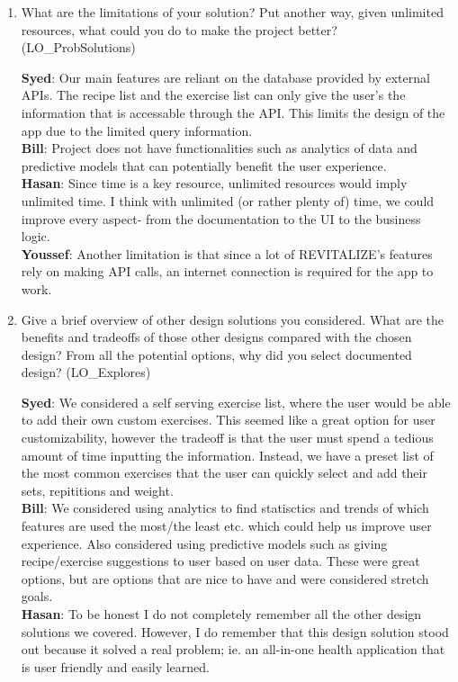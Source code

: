 \documentclass[12pt, titlepage]{article}
\begin{document}
	\begin{enumerate}
		\item What are the limitations of your solution?  Put another way, given
		unlimited resources, what could you do to make the project better? (LO\_ProbSolutions)
		
		\textbf{Syed}: Our main features are reliant on the database provided by external APIs. The recipe list and the exercise list can only give the user's the information that is accessable through the API. This limits the design of the app due to the limited query information. \\
		\textbf{Bill}: Project does not have functionalities such as analytics of data and predictive models that can potentially benefit the user experience. \\
		\textbf{Hasan}: Since time is a key resource, unlimited resources would imply unlimited time. I think with unlimited (or rather plenty of) time, we could improve every aspect- from the documentation to the UI to the business logic. \\
		\textbf{Youssef}: Another limitation is that since a lot of REVITALIZE's features rely on making API calls, an internet connection is required for the app to work. \\
		
		
		\item Give a brief overview of other design solutions you considered.  What
		are the benefits and tradeoffs of those other designs compared with the chosen
		design?  From all the potential options, why did you select documented design?
		(LO\_Explores)
		
		\textbf{Syed}: We considered a self serving exercise list, where the user would be able to add their own custom exercises. This seemed like a great option for user customizability, however the tradeoff is that the user must spend a tedious amount of time inputting the information. Instead, we have a preset list of the most common exercises that the user can quickly select and add their sets, repititions and weight. \\
		\textbf{Bill}: We considered using analytics to find statisctics and trends of which features are used the most/the least etc. which could help us improve user experience. Also considered using predictive models such as giving recipe/exercise suggestions to user based on user data. These were great options, but are options that are nice to have and were considered stretch goals. \\
		\textbf{Hasan}: To be honest I do not completely remember all the other design solutions we covered. However, I do remember that this design solution stood out because it solved a real problem; ie. an all-in-one health application that is user friendly and easily learned. \\
	\end{enumerate}
	
\end{document}
